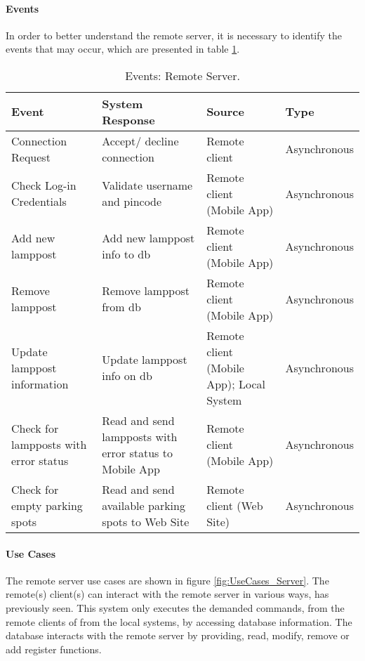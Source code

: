 \paragraph*{Events}
In order to better understand the remote server, it is necessary to identify the events that may occur, which are presented in table \ref{table:rs_events}.

\begin{table}[ht]
	\centering
	\resizebox{\columnwidth}{!}
	{
		\begin{tabular}{|m{3cm}|m{5cm}|m{2.4cm}|m{2.4cm}|}
			\hline
			\textbf{Event} & \textbf{System Response} & \textbf{Source} & \textbf{Type}\\
			\hline\hline
	
			Connection Request & Accept/ decline connection & Remote client & Asynchronous\\\hline
			
			Check Log-in Credentials & Validate username and pincode & Remote client (Mobile App) & Asynchronous\\\hline
			
			Add new lamppost & Add new lamppost info to \ac{db} & Remote client (Mobile App) & Asynchronous\\\hline
			
			Remove lamppost & Remove lamppost from \ac{db} & Remote client (Mobile App) & Asynchronous\\\hline
			
			Update lamppost information & Update lamppost info on \ac{db} & Remote client (Mobile App); Local System & Asynchronous\\\hline
			
			Check for lampposts with error status & Read and send lampposts with error status to Mobile App & Remote client (Mobile App) &  Asynchronous\\\hline
			
			Check for empty parking spots & Read and send available parking spots to Web Site & Remote client (Web Site) & Asynchronous\\\hline
		\end{tabular}
	}
	\caption{Events: Remote Server.}
	\label{table:rs_events}
\end{table}

\clearpage
\paragraph*{Use Cases}
The remote server use cases are shown in figure \ref{fig:UseCases_Server}. The remote(s) client(s) can interact with the remote server in various ways, has previously seen. This system only executes the demanded commands, from the remote clients of from the local systems, by accessing database information. The database interacts with the remote server by providing, read, modify, remove or add register functions.

